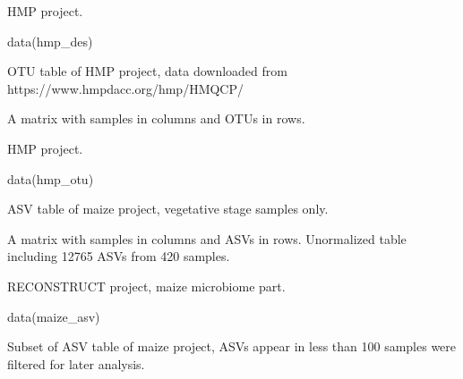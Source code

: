\documentclass[a4paper]{book}
\begin{document}
%
\begin{Source}\relax
HMP project.
\end{Source}
%
\begin{Examples}
\begin{ExampleCode}
data(hmp_des)

\end{ExampleCode}
\end{Examples}
%
\begin{Description}\relax
OTU table of HMP project, data downloaded from
https://www.hmpdacc.org/hmp/HMQCP/
\end{Description}
%
\begin{Format}
A matrix with samples in columns and OTUs in rows.
\end{Format}
%
\begin{Source}\relax
HMP project.
\end{Source}
%
\begin{Examples}
\begin{ExampleCode}
data(hmp_otu)

\end{ExampleCode}
\end{Examples}
%
\begin{Description}\relax
ASV table of maize project, vegetative stage samples only.
\end{Description}
%
\begin{Format}
A matrix with samples in columns and ASVs in rows. Unormalized table
including 12765 ASVs from 420 samples.
\end{Format}
%
\begin{Source}\relax
RECONSTRUCT project, maize microbiome part.
\end{Source}
%
\begin{Examples}
\begin{ExampleCode}
data(maize_asv)

\end{ExampleCode}
\end{Examples}
%
\begin{Description}\relax
Subset of ASV table of maize project, ASVs appear in less than 100 samples
were filtered for later analysis.
\end{Description}
\end{document}
